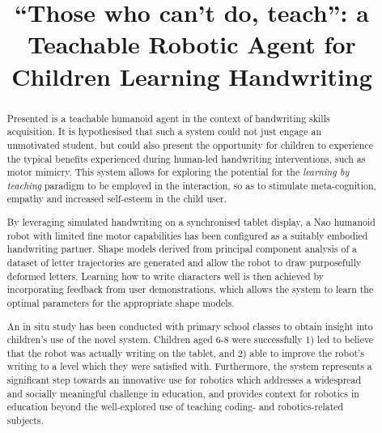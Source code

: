 \documentclass{sig-alternate}
\title{\LARGE \bf
``Those who can't do, teach'': a Teachable Robotic Agent for Children Learning Handwriting
}
\begin{document}
\maketitle

\begin{abstract}



Presented is a teachable humanoid agent in the context of handwriting skills
acquisition. It is hypothesised that such a system could not just engage an
unmotivated student, but could also present the opportunity for children to
experience the typical benefits experienced during human-led handwriting
interventions, such as motor mimicry. This system allows for exploring the
potential for the \emph{learning by teaching} paradigm to be employed in the
interaction, so as to stimulate meta-cognition, empathy and increased
self-esteem in the child user. 

By leveraging simulated handwriting on a synchronised tablet display, a Nao
humanoid robot with limited fine motor capabilities has been configured as a
suitably embodied handwriting partner. Shape models derived from principal
component analysis of a dataset of letter trajectories are generated and allow
the robot to draw purposefully deformed letters. Learning how to write
characters well is then achieved by incorporating feedback from user
demonstrations, which allows the system to learn the optimal parameters for the
appropriate shape models. 

An in situ study has been conducted with primary school classes to obtain
insight into children's use of the novel system. 
Children aged 6-8 were successfully 1) led to believe that the robot was
actually writing on the tablet, and 2) able to improve the robot's writing to a
level which they were satisfied with. Furthermore, the system represents a
significant step towards an innovative use for robotics which addresses a
widespread and socially meaningful challenge in education, and provides context
for robotics in education beyond the well-explored use of teaching coding- and
robotics-related subjects.

\end{abstract}
\end{document}
